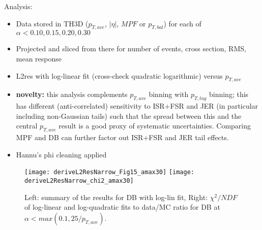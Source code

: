 \documentclass[landscape,10pt]{beamer} %
\begin{document}
Analysis:
\begin{itemize}
\item Data stored in TH3D ($p_{T,ave}$, $|\eta|$, $MPF$ or $p_{T,bal}$) for each of $\alpha<0.10, 0.15, 0.20, 0.30$
\item Projected and sliced from there for number of events, cross section, RMS, mean response
\item L2res with log-linear fit (cross-check quadratic logarithmic) versus $p_{T,ave}$
\item {\bf novelty:} this analysis complements $p_{T,ave}$ binning with $p_{T,tag}$ binning; this has different (anti-correlated) sensitivity to ISR+FSR and JER (in particular including non-Gaussian tails) such that the spread between this and the central $p_{T,ave}$ result is a good proxy of systematic uncertainties. Comparing MPF and DB can further factor out ISR+FSR and JER tail effects.
\item Hannu's phi cleaning applied
\end{itemize}

\newpage

\begin{figure}[p]
\centering
  \texttt{[image: deriveL2ResNarrow\_Fig15\_amax30]}
  \texttt{[image: deriveL2ResNarrow\_chi2\_amax30]}
  \caption{Left: summary of the results for DB with log-lin fit, Right: $\chi^2/NDF$ of log-linear and log-quadratic fits to data/MC ratio for DB at $\alpha<max(0.1,25/p_{T,ave})$.}
\end{figure}
\end{document}
